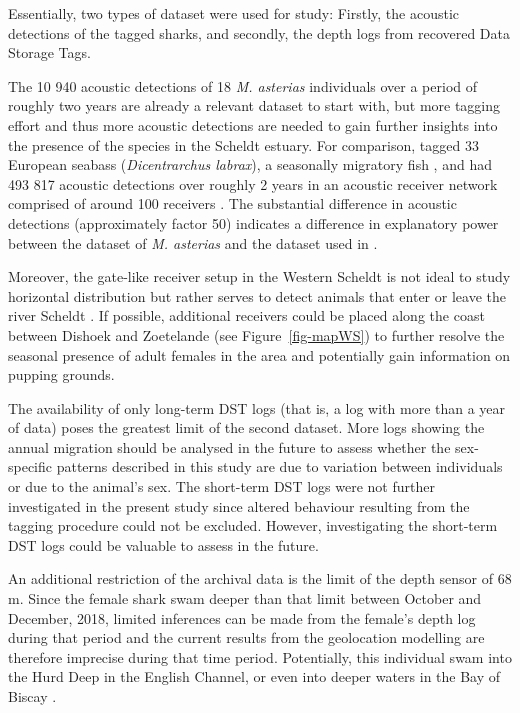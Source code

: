 \documentclass[
  authoryear,
  review,
  3p]{elsarticle}
\begin{document}
Essentially, two types of dataset were used for study: Firstly, the
acoustic detections of the tagged sharks, and secondly, the depth logs
from recovered Data Storage Tags.

The 10 940 acoustic detections of 18 \emph{M. asterias} individuals over
a period of roughly two years are already a relevant dataset to start
with, but more tagging effort and thus more acoustic detections are
needed to gain further insights into the presence of the species in the
Scheldt estuary. For comparison, \citet{hereu_2023} tagged 33 European
seabass (\emph{Dicentrarchus labrax}), a seasonally migratory fish
\citep{pawson_2007}, and had 493 817 acoustic detections over roughly 2
years in an acoustic receiver network comprised of around 100 receivers
\citep{aspillaga_2017}. The substantial difference in acoustic
detections (approximately factor 50) indicates a difference in
explanatory power between the dataset of \emph{M. asterias} and the
dataset used in \citet{hereu_2023}.

Moreover, the gate-like receiver setup in the Western Scheldt is not
ideal to study horizontal distribution but rather serves to detect
animals that enter or leave the river Scheldt \citep{reubens_2019}. If
possible, additional receivers could be placed along the coast between
Dishoek and Zoetelande (see Figure~\ref{fig-mapWS}) to further resolve
the seasonal presence of adult females in the area and potentially gain
information on pupping grounds.

The availability of only long-term DST logs (that is, a log with more
than a year of data) poses the greatest limit of the second dataset.
More logs showing the annual migration should be analysed in the future
to assess whether the sex-specific patterns described in this study are
due to variation between individuals or due to the animal's sex. The
short-term DST logs were not further investigated in the present study
since altered behaviour resulting from the tagging procedure could not
be excluded. However, investigating the short-term DST logs could be
valuable to assess in the future.

An additional restriction of the archival data is the limit of the depth
sensor of 68 m. Since the female shark swam deeper than that limit
between October and December, 2018, limited inferences can be made from
the female's depth log during that period and the current results from
the geolocation modelling are therefore imprecise during that time
period. Potentially, this individual swam into the Hurd Deep in the
English Channel, or even into deeper waters in the Bay of Biscay
\citep[as hypothesised by][]{breve_2016}.
\end{document}
